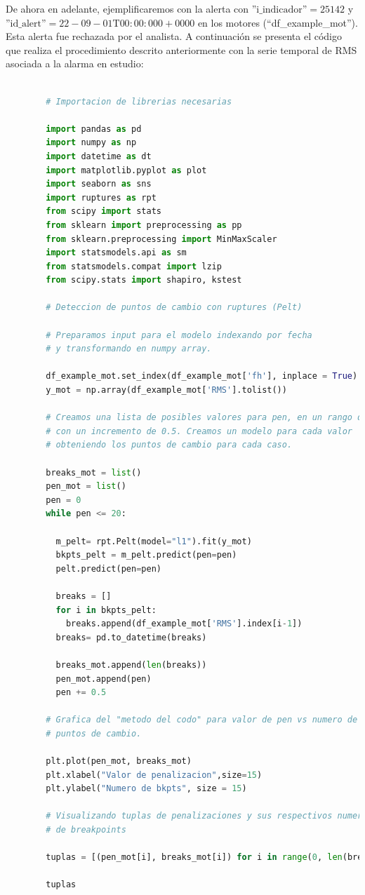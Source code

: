 \documentclass{article}[14pts]
\begin{document}
    De ahora en adelante, ejemplificaremos con la alerta con $\text{''i\_indicador''}= 25142$ y $\text{''id\_alert''} = 22-09-01\text{T}00:00:000+0000$ en los motores (``df\_example\_mot''). Esta alerta fue rechazada por el analista. A continuación se presenta el código que realiza el procedimiento descrito anteriormente con la serie temporal de RMS asociada a la alarma en estudio: 

      \begin{lstlisting}[language=Python]

        # Importacion de librerias necesarias

        import pandas as pd
        import numpy as np
        import datetime as dt 
        import matplotlib.pyplot as plot
        import seaborn as sns 
        import ruptures as rpt 
        from scipy import stats
        from sklearn import preprocessing as pp
        from sklearn.preprocessing import MinMaxScaler
        import statsmodels.api as sm
        from statsmodels.compat import lzip
        from scipy.stats import shapiro, kstest
       
        # Deteccion de puntos de cambio con ruptures (Pelt)

        # Preparamos input para el modelo indexando por fecha 
        # y transformando en numpy array.

        df_example_mot.set_index(df_example_mot['fh'], inplace = True)
        y_mot = np.array(df_example_mot['RMS'].tolist())

        # Creamos una lista de posibles valores para pen, en un rango de 0 a 20 
        # con un incremento de 0.5. Creamos un modelo para cada valor
        # obteniendo los puntos de cambio para cada caso.

        breaks_mot = list()
        pen_mot = list()
        pen = 0
        while pen <= 20:
    
          m_pelt= rpt.Pelt(model="l1").fit(y_mot)
          bkpts_pelt = m_pelt.predict(pen=pen)
          pelt.predict(pen=pen)
          
          breaks = []
          for i in bkpts_pelt:
            breaks.append(df_example_mot['RMS'].index[i-1])
          breaks= pd.to_datetime(breaks)
          
          breaks_mot.append(len(breaks))
          pen_mot.append(pen)
          pen += 0.5
        
        # Grafica del "metodo del codo" para valor de pen vs numero de 
        # puntos de cambio.
          
        plt.plot(pen_mot, breaks_mot)
        plt.xlabel("Valor de penalizacion",size=15)
        plt.ylabel("Numero de bkpts", size = 15)

        # Visualizando tuplas de penalizaciones y sus respectivos numeros 
        # de breakpoints

        tuplas = [(pen_mot[i], breaks_mot[i]) for i in range(0, len(breaks_mot))]

        tuplas

      \end{lstlisting}
\end{document}
